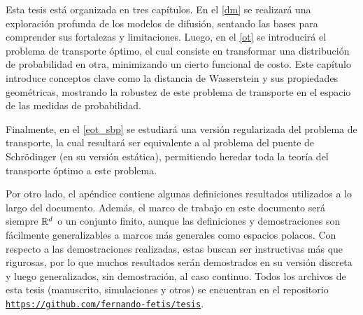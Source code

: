 Esta tesis está organizada en tres capítulos. En el \autoref{dm} se realizará una exploración profunda de los modelos de difusión, sentando las bases para comprender sus fortalezas y limitaciones. Luego, en el \autoref{ot} se introducirá el problema de transporte óptimo, el cual consiste en transformar una distribución de probabilidad en otra, minimizando un cierto funcional de costo. Este capítulo introduce conceptos clave como la distancia de Wasserstein y sus propiedades geométricas, mostrando la robustez de este problema de transporte en el espacio de las medidas de probabilidad.

Finalmente, en el \autoref{eot_sbp} se estudiará una versión regularizada del problema de transporte, la cual resultará ser equivalente a al problema del puente de Schrödinger (en su versión estática), permitiendo heredar toda la teoría del transporte óptimo a este problema.

Por otro lado, el apéndice contiene algunas definiciones resultados utilizados a lo largo del documento. Además, el marco de trabajo en este documento será siempre $\mathbb{R}^d$ o un conjunto finito, aunque las definiciones y demostraciones son fácilmente generalizables a marcos más generales como espacios polacos. Con respecto a las demostraciones realizadas, estas buscan ser instructivas más que rigurosas, por lo que muchos resultados serán demostrados en su versión discreta y luego generalizados, sin demostración, al caso continuo. Todos los archivos de esta tesis (manuscrito, simulaciones y otros) se encuentran en el repositorio \href{https://github.com/fernando-fetis/tesis}{\texttt{https://github.com/fernando-fetis/tesis}}.